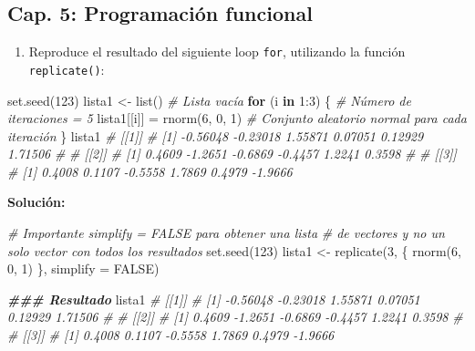 \documentclass[
]{article}
\newenvironment{Shaded}{\begin{snugshade}}{\end{snugshade}}
\newcommand{\AttributeTok}[1]{\textcolor[rgb]{0.77,0.63,0.00}{#1}}
\newcommand{\CommentTok}[1]{\textcolor[rgb]{0.56,0.35,0.01}{\textit{#1}}}
\newcommand{\ConstantTok}[1]{\textcolor[rgb]{0.00,0.00,0.00}{#1}}
\newcommand{\ControlFlowTok}[1]{\textcolor[rgb]{0.13,0.29,0.53}{\textbf{#1}}}
\newcommand{\DecValTok}[1]{\textcolor[rgb]{0.00,0.00,0.81}{#1}}
\newcommand{\DocumentationTok}[1]{\textcolor[rgb]{0.56,0.35,0.01}{\textbf{\textit{#1}}}}
\newcommand{\FunctionTok}[1]{\textcolor[rgb]{0.00,0.00,0.00}{#1}}
\newcommand{\NormalTok}[1]{#1}
\newcommand{\OtherTok}[1]{\textcolor[rgb]{0.56,0.35,0.01}{#1}}
\newcommand{\SpecialCharTok}[1]{\textcolor[rgb]{0.00,0.00,0.00}{#1}}
\providecommand{\tightlist}{%
  \setlength{\itemsep}{0pt}\setlength{\parskip}{0pt}}
\theoremstyle{definition}
\theoremstyle{definition}
\theoremstyle{definition}
\theoremstyle{definition}
\theoremstyle{remark}
\begin{document}
\hypertarget{cap.-5-programaciuxf3n-funcional}{%
\subsection{Cap. 5: Programación funcional}\label{cap.-5-programaciuxf3n-funcional}}

\begin{enumerate}
\def\labelenumi{\arabic{enumi}.}
\tightlist
\item
  Reproduce el resultado del siguiente loop \texttt{for}, utilizando la función \texttt{replicate()}:
\end{enumerate}

\begin{Shaded}
\begin{Highlighting}[]
\FunctionTok{set.seed}\NormalTok{(}\DecValTok{123}\NormalTok{)}
\NormalTok{lista1 }\OtherTok{\textless{}{-}} \FunctionTok{list}\NormalTok{() }\CommentTok{\# Lista vacía}
\ControlFlowTok{for}\NormalTok{ (i }\ControlFlowTok{in} \DecValTok{1}\SpecialCharTok{:}\DecValTok{3}\NormalTok{) \{ }\CommentTok{\# Número de iteraciones = 5}
\NormalTok{  lista1[[i]] }\OtherTok{=} \FunctionTok{rnorm}\NormalTok{(}\DecValTok{6}\NormalTok{, }\DecValTok{0}\NormalTok{, }\DecValTok{1}\NormalTok{) }\CommentTok{\# Conjunto aleatorio normal para cada iteración}
\NormalTok{\}}
\NormalTok{lista1}
\CommentTok{\# [[1]]}
\CommentTok{\# [1] {-}0.56048 {-}0.23018  1.55871  0.07051  0.12929  1.71506}
\CommentTok{\# }
\CommentTok{\# [[2]]}
\CommentTok{\# [1]  0.4609 {-}1.2651 {-}0.6869 {-}0.4457  1.2241  0.3598}
\CommentTok{\# }
\CommentTok{\# [[3]]}
\CommentTok{\# [1]  0.4008  0.1107 {-}0.5558  1.7869  0.4979 {-}1.9666}
\end{Highlighting}
\end{Shaded}

\textbf{Solución:}

\begin{Shaded}
\begin{Highlighting}[]
\CommentTok{\# Importante simplify = FALSE para obtener una lista }
\CommentTok{\# de vectores y no un solo vector con todos los resultados}
\FunctionTok{set.seed}\NormalTok{(}\DecValTok{123}\NormalTok{)}
\NormalTok{lista1 }\OtherTok{\textless{}{-}} \FunctionTok{replicate}\NormalTok{(}\DecValTok{3}\NormalTok{, \{}
  \FunctionTok{rnorm}\NormalTok{(}\DecValTok{6}\NormalTok{, }\DecValTok{0}\NormalTok{, }\DecValTok{1}\NormalTok{)}
\NormalTok{  \}, }
  \AttributeTok{simplify =} \ConstantTok{FALSE}\NormalTok{) }

\DocumentationTok{\#\#\# Resultado}
\NormalTok{lista1}
\CommentTok{\# [[1]]}
\CommentTok{\# [1] {-}0.56048 {-}0.23018  1.55871  0.07051  0.12929  1.71506}
\CommentTok{\# }
\CommentTok{\# [[2]]}
\CommentTok{\# [1]  0.4609 {-}1.2651 {-}0.6869 {-}0.4457  1.2241  0.3598}
\CommentTok{\# }
\CommentTok{\# [[3]]}
\CommentTok{\# [1]  0.4008  0.1107 {-}0.5558  1.7869  0.4979 {-}1.9666}
\end{Highlighting}
\end{Shaded}
\end{document}
